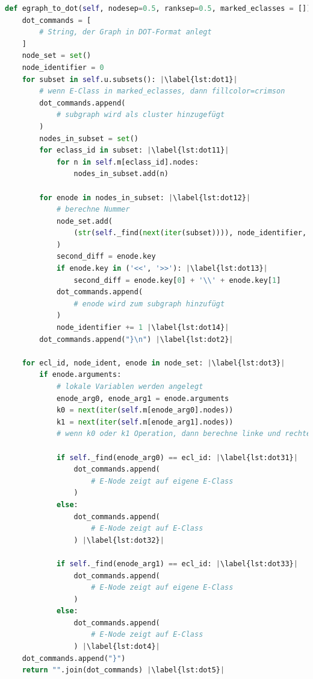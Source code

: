 \begin{lstlisting}[language=Python, escapechar=|, caption=\textit{egraph\_to\_dot}-Methode, label={lst:methods4}]
def egraph_to_dot(self, nodesep=0.5, ranksep=0.5, marked_eclasses = []):
    dot_commands = [
        # String, der Graph in DOT-Format anlegt
    ]
    node_set = set()
    node_identifier = 0
    for subset in self.u.subsets(): |\label{lst:dot1}|
        # wenn E-Class in marked_eclasses, dann fillcolor=crimson
        dot_commands.append(
            # subgraph wird als cluster hinzugefügt
        )
        nodes_in_subset = set()
        for eclass_id in subset: |\label{lst:dot11}|
            for n in self.m[eclass_id].nodes:
                nodes_in_subset.add(n)

        for enode in nodes_in_subset: |\label{lst:dot12}|
            # berechne Nummer
            node_set.add(
                (str(self._find(next(iter(subset)))), node_identifier, enode)
            )
            second_diff = enode.key
            if enode.key in ('<<', '>>'): |\label{lst:dot13}|
                second_diff = enode.key[0] + '\\' + enode.key[1]
            dot_commands.append(
                # enode wird zum subgraph hinzufügt
            )
            node_identifier += 1 |\label{lst:dot14}|
        dot_commands.append("}\n") |\label{lst:dot2}|

    for ecl_id, node_ident, enode in node_set: |\label{lst:dot3}|
        if enode.arguments:
            # lokale Variablen werden angelegt
            enode_arg0, enode_arg1 = enode.arguments
            k0 = next(iter(self.m[enode_arg0].nodes))
            k1 = next(iter(self.m[enode_arg1].nodes))
            # wenn k0 oder k1 Operation, dann berechne linke und rechte Nummer 

            if self._find(enode_arg0) == ecl_id: |\label{lst:dot31}|
                dot_commands.append(
                    # E-Node zeigt auf eigene E-Class
                )
            else:
                dot_commands.append(
                    # E-Node zeigt auf E-Class
                ) |\label{lst:dot32}|

            if self._find(enode_arg1) == ecl_id: |\label{lst:dot33}|
                dot_commands.append(
                    # E-Node zeigt auf eigene E-Class
                )
            else:
                dot_commands.append(
                    # E-Node zeigt auf E-Class 
                ) |\label{lst:dot4}|
    dot_commands.append("}")
    return "".join(dot_commands) |\label{lst:dot5}|  
\end{lstlisting} 

